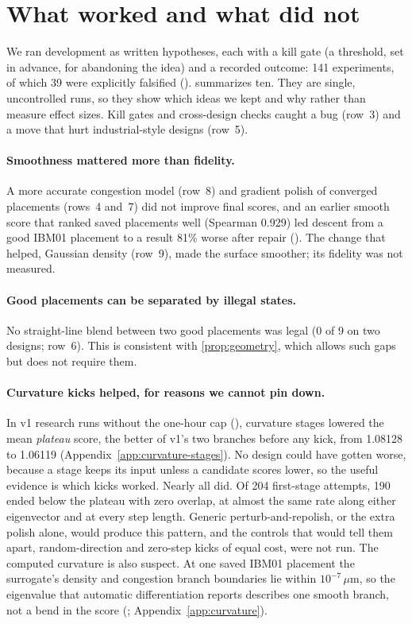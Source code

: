 \section{What worked and what did not}\label{sec:lessons}

We ran development as written hypotheses, each with a kill gate (a threshold, set in
advance, for abandoning the idea) and a recorded outcome: 141 experiments, of which 39
were explicitly falsified (\historical).  summarizes ten. They
are single, uncontrolled runs, so they show which ideas we kept and why rather than
measure effect sizes. Kill gates and cross-design checks caught a bug (row~3) and a
move that hurt industrial-style designs (row~5).



\paragraph{Smoothness mattered more than fidelity.} A more accurate congestion model
(row~8) and gradient polish of converged placements (rows~4 and~7) did not improve
final scores, and an earlier smooth score that ranked saved placements well
(Spearman 0.929) led descent from a good IBM01 placement to a result 81\% worse after
repair (\historical). The change that helped, Gaussian density (row~9), made the
surface smoother; its fidelity was not measured.

\paragraph{Good placements can be separated by illegal states.} No straight-line blend
between two good placements was legal (0 of 9 on two designs; row~6). This is
consistent with \cref{prop:geometry}, which allows such gaps but does not require
them.

\paragraph{Curvature kicks helped, for reasons we cannot pin down.} In v1 research
runs without the one-hour cap (\historical), curvature stages lowered the mean
\emph{plateau} score, the better of v1's two branches before any kick, from 1.08128
to 1.06119 (Appendix~\ref{app:curvature-stages}). No design could have gotten worse, because a stage
keeps its input unless a candidate scores lower, so the useful evidence is which
kicks worked. Nearly all did. Of 204 first-stage attempts, 190 ended below the
plateau with zero overlap, at almost the same rate along either eigenvector and at
every step length. Generic perturb-and-repolish, or the extra polish alone, would
produce this pattern, and the controls that would tell them apart, random-direction
and zero-step kicks of equal cost, were not run. The computed curvature is also
suspect. At one saved IBM01 placement the surrogate's density and congestion branch
boundaries lie within $10^{-7}\,\mu$m, so the eigenvalue that automatic
differentiation reports describes one smooth branch, not a bend in the score
(\measurement; Appendix~\ref{app:curvature}).

